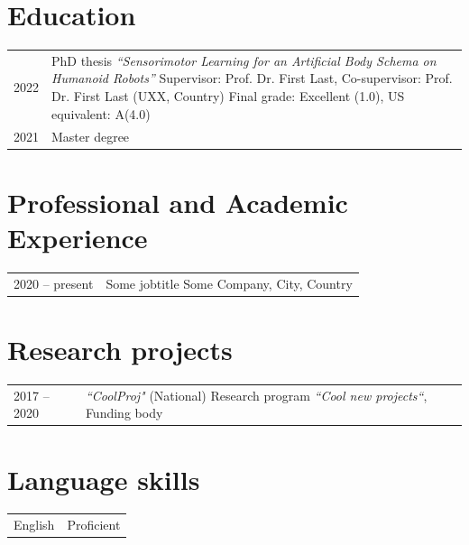\documentclass[english,a4paper,oneside,11pt, DIV=15,parskip=half-]{scrartcl}
\begin{document}
\section*{Education}
\begin{tabulary}{\textwidth}{|p{2.5cm}L}
2022 & PhD thesis
  \newline \textit{``Sensorimotor Learning for an Artificial Body Schema on Humanoid Robots''}
  \newline Supervisor: Prof. Dr. First Last,
  \newline Co-supervisor: Prof. Dr. First Last (UXX, Country)
  \newline
  \newline Final grade: Excellent (1.0), US equivalent: A(4.0)
  \newline \\
2021 &  Master degree \newline \\
\end{tabulary}

\section*{Professional and Academic Experience}
\begin{tabulary}{\textwidth}{|p{2.5cm}L}
2020 – present  & Some jobtitle
  \newline Some Company, City, Country \\
\end{tabulary}

\section*{Research projects}

\begin{tabulary}{\textwidth}{|p{2.5cm}L}
2017 – 2020 &  \textit{“CoolProj"} (National) \newline
Research program \textit{“Cool new projects“}, Funding body \\
\end{tabulary}

\section*{Language skills}

\begin{tabulary}{\textwidth}{|p{2.5cm}L}
English &
Proficient \\
\end{tabulary}
\end{document}
